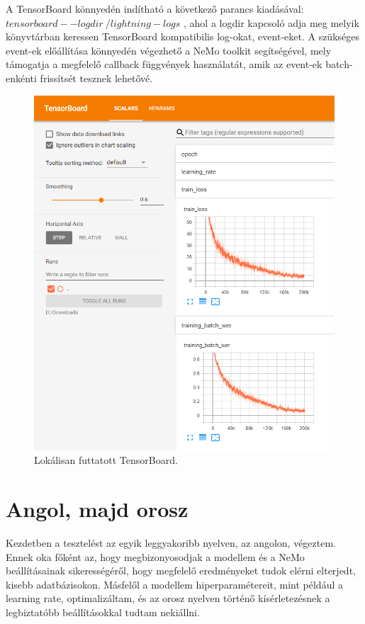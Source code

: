 A TensorBoard könnyedén indítható a következő parancs kiadásával: $tensorboard --logdir ~/lightning-logs$ , ahol a logdir kapcsoló adja meg melyik könyvtárban keressen TensorBoard kompatibilis log-okat, event-eket. A szükséges event-ek előállítása könnyedén végezhető a NeMo toolkit segítségével, mely támogatja a megfelelő callback függvények használatát, amik az event-ek batch-enkénti frissítsét tesznek lehetővé.

\begin{figure}[!ht]
\centering
\includegraphics[width=150mm, keepaspectratio]{figures/tensorboard-example.png}
\caption{Lokálisan futtatott TensorBoard.}
\label{fig:TeXstudio}
\end{figure}

\section{Angol, majd orosz}

Kezdetben a tesztelést az egyik leggyakoribb nyelven, az angolon, végeztem. Ennek oka főként az, hogy megbizonyosodjak a modellem és a NeMo beállításainak sikerességéről, hogy megfelelő eredményeket tudok elérni elterjedt, kisebb adatbázisokon. Másfelől a modellem hiperparamétereit, mint például a learning rate, optimalizáltam, és az orosz nyelven történő kísérletezésnek a legbiztatóbb beállításokkal tudtam nekiállni.

